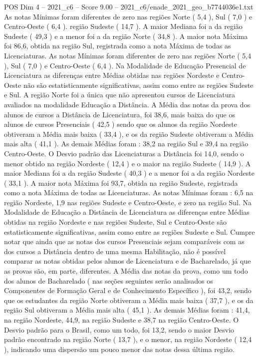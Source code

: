 \begin{textsample}{POS Dim 4 – 2021\_c6 – Score 9.00 – 2021\_c6/enade\_2021\_geo\_b7744036e1.txt}
As notas Mínimas foram diferentes de zero nas regiões Norte ( 5,4 ), Sul ( 7,0 ) e Centro-Oeste ( 6,4 ). região Sudeste ( 14,7 ).
A maior Mediana foi a da região Sudeste ( 49,3 ) e a menor foi a da região Norte ( 34,8 ).
A maior nota Máxima foi 86,6, obtida na região Sul, registrada como a nota Máxima de todas as Licenciaturas.
As notas Mínimas foram diferentes de zero nas regiões Norte ( 5,4 ), Sul ( 7,0 ) e Centro-Oeste ( 6,4 ).
Na Modalidade de Educação Presencial de Licenciatura as diferenças entre Médias obtidas nas regiões Nordeste e Centro-Oeste não são estatisticamente significativas, assim como entre as regiões Sudeste e Sul.
A região Norte foi a única que não apresentou cursos de Licenciatura avaliados na modalidade Educação a Distância.
A Média das notas da prova dos alunos de cursos a Distância de Licenciatura, foi 38,6, mais baixa do que os alunos de cursos Presenciais ( 42,5 ) sendo que os alunos da região Nordeste obtiveram a Média mais baixa ( 33,4 ), e os da região Sudeste obtiveram a Média mais alta ( 41,1 ).
As demais Médias foram : 38,2 na região Sul e 39,4 na região Centro-Oeste.
O Desvio padrão das Licenciaturas a Distância foi 14,0, sendo o menor obtido na região Nordeste ( 12,4 ) e o maior na região Sudeste ( 14,9 ).
A maior Mediana foi a da região Sudeste ( 40,3 ) e a menor foi a da região Nordeste ( 33,1 ).
A maior nota Máxima foi 93,7, obtida na região Sudeste, registrada como a nota Máxima de todas as Licenciaturas.
As notas Mínimas foram : 6,5 na região Nordeste, 1,9 nas regiões Sudeste e Centro-Oeste, e zero na região Sul.
Na Modalidade de Educação a Distância de Licenciatura as diferenças entre Médias obtidas na região Nordeste e nas regiões Sudeste, Sul e Centro-Oeste são estatisticamente significativas, assim como entre as regiões Sudeste e Sul.
Cumpre notar que ainda que as notas dos cursos Presenciais sejam comparáveis com as dos cursos a Distância dentro de uma mesma Habilitação, não é possível comparar as notas obtidas pelos alunos de Licenciatura e de Bacharelado, já que as provas são, em parte, diferentes.
A Média das notas da prova, como um todo dos alunos de Bacharelado ( nas seções seguintes serão analisados os Componentes de Formação Geral e de Conhecimento Específico ), foi 43,2, sendo que os estudantes da região Norte obtiveram a Média mais baixa ( 37,7 ), e os da região Sul obtiveram a Média mais alta ( 45,1 ).
As demais Médias foram : 41,4, na região Nordeste, 44,9, na região Sudeste e 38,7 na região Centro-Oeste.
O Desvio padrão para o Brasil, como um todo, foi 13,2, sendo o maior Desvio padrão encontrado na região Norte ( 13,7 ), e o menor, na região Nordeste ( 12,4 ), indicando uma dispersão um pouco menor das notas dessa última região.

\end{textsample}
